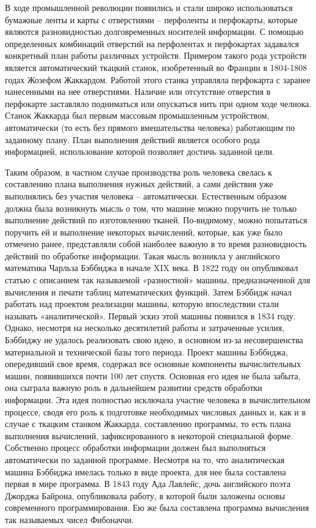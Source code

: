 В ходе промышленной революции появились и стали широко использоваться бумажные ленты и карты с отверстиями – перфоленты и перфокарты, которые являются разновидностью долговременных носителей информации. С помощью определенных комбинаций отверстий на перфолентах и перфокартах задавался конкретный план работы различных устройств. Примером такого рода устройств является автоматический ткацкий станок, изобретенный во Франции в 1804-1808 годах Жозефом Жаккардом. Работой этого станка управляла перфокарта с заранее нанесенными на нее отверстиями. Наличие или отсутствие отверстия в перфокарте заставляло подниматься или опускаться нить при одном ходе челнока. Станок Жаккарда был первым массовым промышленным устройством, автоматически (то есть без прямого вмешательства человека) работающим по заданному плану. План выполнения действий является особого рода информацией, использование которой позволяет достичь заданной цели.

Таким образом, в частном случае производства роль человека свелась к составлению плана выполнения нужных действий, а сами действия уже выполнялись без участия человека – автоматически. Естественным образом должна была возникнуть мысль о том, что машине можно поручить не только выполнение действий по изготовлению тканей. По-видимому, можно попытаться поручить ей и выполнение некоторых вычислений, которые, как уже было отмечено ранее, представляли собой наиболее важную в то время разновидность действий по обработке информации. Такая мысль возникла у английского математика Чарльза Бэббиджа в начале XIX века. В 1822 году он опубликовал статью с описанием так называемой «разностной» машины, предназначенной для вычисления и печати таблиц математических функций. Затем Бэббидж начал работать над проектом реализации машины, которую впоследствии стали называть «аналитической». Первый эскиз этой машины появился в 1834 году. Однако, несмотря на несколько десятилетий работы и затраченные усилия, Бэббиджу не удалось реализовать свою идею, в основном из-за несовершенства материальной и технической базы того периода. Проект машины Бэббиджа, опередивший свое время, содержал все основные компоненты вычислительных машин, появившихся почти 100 лет спустя. Основная его идея не была забыта, она сыграла важную роль в дальнейшем развитии средств обработки информации. Эта идея полностью исключала участие человека в вычислительном процессе, сводя его роль к подготовке необходимых числовых данных и, как и в случае с ткацким станком Жаккарда, составлению программы, то есть плана выполнения вычислений, зафиксированного в некоторой специальной форме. Собственно процесс обработки информации должен был выполняться автоматически по заданной программе. Несмотря на то, что аналитическая машина Бэббиджа имелась только в виде проекта, для нее была составлена первая в мире программа. В 1843 году Ада Лавлейс, дочь английского поэта Джорджа Байрона, опубликовала работу, в которой были заложены основы современного программирования. Ею же была составлена программа вычисления так называемых чисел Фибоначчи.

